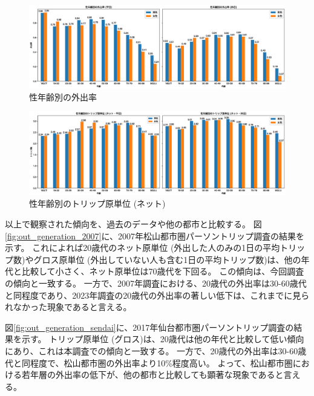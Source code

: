 \documentclass[a4paper,12pt, uplatex]{jsbook}
\begin{document}
\begin{figure}[htbp]
    \centering
    \includegraphics[width=1.0\textwidth]{picture/性年齢別の外出率.eps}
    \caption{性年齢別の外出率}
    \label{fig:out_gender_age}
\end{figure}

\begin{figure}[htbp]
    \centering
    \includegraphics[width=1.0\textwidth]{picture/性年齢別のトリップ数_ネット.eps}
    \caption{性年齢別のトリップ原単位 (ネット)}
    \label{fig:generation_gender_age_net}
\end{figure}

以上で観察された傾向を、過去のデータや他の都市と比較する。
図\ref{fig:out_generation_2007}に、2007年松山都市圏パーソントリップ調査の結果を示す。
これによれば20歳代のネット原単位 (外出した人のみの1日の平均トリップ数)やグロス原単位 (外出していない人も含む1日の平均トリップ数)は、他の年代と比較して小さく、ネット原単位は70歳代を下回る。
この傾向は、今回調査の傾向と一致する。
一方で、2007年調査における、20歳代の外出率は30-60歳代と同程度であり、2023年調査の20歳代の外出率の著しい低下は、これまでに見られなかった現象であると言える。

図\ref{fig:out_generation_sendai}に、2017年仙台都市圏パーソントリップ調査の結果を示す。
トリップ原単位 (グロス)は、20歳代は他の年代と比較して低い傾向にあり、これは本調査での傾向と一致する。
一方で、20歳代の外出率は30-60歳代と同程度で、松山都市圏の外出率より10\%程度高い。
よって、松山都市圏における若年層の外出率の低下が、他の都市と比較しても顕著な現象であると言える。
\end{document}
